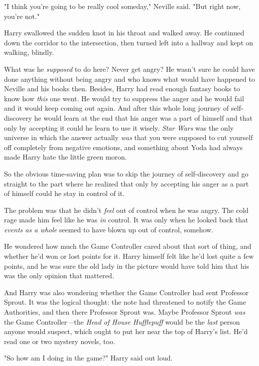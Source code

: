 "I think you're going to be really cool someday," Neville said. "But right now,
you're not."

Harry swallowed the sudden knot in his throat and walked away. He continued
down the corridor to the intersection, then turned left into a hallway and kept
on walking, blindly.

What was he \emph{supposed} to do here? Never get angry? He wasn't sure he
could have done anything without being angry and who knows what would have
happened to Neville and his books then. Besides, Harry had read enough fantasy
books to know how \emph{this} one went. He would try to suppress the anger and
he would fail and it would keep coming out again. And after this whole long
journey of self-discovery he would learn at the end that his anger was a part
of himself and that only by accepting it could he learn to use it wisely.
\emph{Star Wars} was the only universe in which the answer actually \emph{was}
that you were supposed to cut yourself off completely from negative emotions,
and something about Yoda had always made Harry hate the little green moron.

So the obvious time-saving plan was to skip the journey of self-discovery and
go straight to the part where he realized that only by accepting his anger as a
part of himself could he stay in control of it.

The problem was that he didn't \emph{feel} out of control when he was angry.
The cold rage made him feel like he was \emph{in} control. It was only when he
looked back that \emph{events as a whole} seemed to have{\el} blown up out
of control, somehow.

He wondered how much the Game Controller cared about that sort of thing, and
whether he'd won or lost points for it. Harry himself felt like he'd lost quite
a few points, and he was sure the old lady in the picture would have told him
that his was the only opinion that mattered.

And Harry was also wondering whether the Game Controller had sent Professor
Sprout. It was the logical thought: the note had threatened to notify the Game
Authorities, and then there Professor Sprout was. Maybe Professor Sprout
\emph{was} the Game Controller---the \emph{Head of House Hufflepuff} would be
the \emph{last} person anyone would suspect, which ought to put her near the
top of Harry's list. He'd read one or two mystery novels, too.

"So how am I doing in the game?" Harry said out loud.

